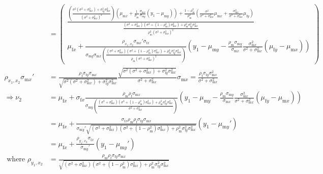\documentclass{article}
\newcommand{\x}[1]{\text{#1}}
\begin{document}
\begin{landscape}
\begin{align*}
\\&=\left(\begin{array}{cc}\frac{\left(\frac{\sigma^2(\sigma^2+\sigma_{\x{m}x}^2)+\sigma_{\x{f}y}^2\sigma_{\x{m}x}^2}{(\sigma^2+\sigma_{\x{m}x}^2)^2}\right)\left(\mu_{\x{m}x}+\frac{1}{\rho_\x{m}}\frac{\sigma_{\x{m}x}}{\sigma_{\x{m}y}}(y_1-\mu_{\x{m}y})\right)+\frac{1-\rho_\x{m}^2}{\rho_\x{m}^2}\left(\frac{\sigma^2}{\sigma^2+\sigma_{\x{m}x}^2}\mu_{\x{m}x}+\frac{\sigma_{\x{m}x}^2}{\sigma^2+\sigma_{\x{m}x}^2}\mu_{\x{f}y}\right)}{\frac{(\sigma^2+\sigma_{\x{m}x}^2)(\sigma^2+(1-\rho_\x{m}^2)\sigma_{\x{m}x}^2)+\rho_\x{m}^2\sigma_{\x{f}y}^2\sigma_{\x{m}x}^2}{\rho_\x{m}^2(\sigma^2+\sigma_{\x{m}x}^2)^2}} \\ \mu_{\x{f}x}+\frac{\rho_{x_1,x_2}\sigma_{\x{m}x}'\sigma_{\x{f}x}}{\sigma_{\x{m}y}\sigma_{\x{m}x}\left(\frac{(\sigma^2+\sigma_{\x{m}x}^2)(\sigma^2+(1-\rho_\x{m}^2)\sigma_{\x{m}x}^2)+\rho_\x{m}^2\sigma_{\x{f}y}^2\sigma_{\x{m}x}^2}{\rho_\x{m}(\sigma^2+\sigma_{\x{m}x}^2)^2}\right)}\left(y_1-\mu_{\x{m}y}-\frac{\rho_\x{m}\sigma_{\x{m}y}}{\sigma_{\x{m}x}}\frac{\sigma_{\x{m}x}^2}{\sigma^2+\sigma_{\x{m}x}^2}\left(\mu_{\x{f}y}-\mu_{\x{m}x}\right)\right) \end{array}\right)
\\ \rho_{x_1,x_2}\sigma_{\x{m}x}'&=\frac{\rho_\x{f}\sigma_{\x{f}y}\sigma_{\x{m}x}}{\sqrt{\sigma^2(\sigma^2+\sigma_{\x{m}x}^2)+\sigma_{\x{f}y}^2\sigma_{\x{m}x}^2}}\frac{\sqrt{\sigma^2(\sigma^2+\sigma_{\x{m}x}^2)+\sigma_{\x{f}y}^2\sigma_{\x{m}x}^2}}{\sigma^2+\sigma_{\x{m}x}^2}\sigma_{\x{m}x}=\frac{\rho_\x{f}\sigma_{\x{f}y}\sigma_{\x{m}x}^2}{\sigma^2+\sigma_{\x{m}x}^2}
\\ \Rightarrow \nu_2&= \mu_{\x{f}x}+\sigma_{\x{f}x}\frac{\rho_\x{m}\rho_\x{f}\sigma_{\x{m}x}}{\sigma_{\x{m}y}\left(\frac{(\sigma^2+\sigma_{\x{m}x}^2)(\sigma^2+(1-\rho_\x{m}^2)\sigma_{\x{m}x}^2)+\rho_\x{m}^2\sigma_{\x{f}y}^2\sigma_{\x{m}x}^2}{\sigma^2+\sigma_{\x{m}x}^2}\right)}\left(y_1-\mu_{\x{m}y}-\frac{\rho_\x{m}\sigma_{\x{m}y}}{\sigma_{\x{m}x}}\frac{\sigma_{\x{m}x}^2}{\sigma^2+\sigma_{\x{m}x}^2}\left(\mu_{\x{f}y}-\mu_{\x{m}x}\right)\right)
\\&= \mu_{\x{f}x}+\frac{\sigma_{\x{f}x}\rho_\x{m}\rho_\x{f}\sigma_{\x{f}y}\sigma_{\x{m}x}}{\sigma_{\x{m}y}'\sqrt{(\sigma^2+\sigma_{\x{m}x}^2)(\sigma^2+(1-\rho_\x{m}^2)\sigma_{\x{m}x}^2)+\rho_\x{m}^2\sigma_{\x{f}y}^2\sigma_{\x{m}x}^2}}\left(y_1-\mu_{\x{m}y}'\right)
\\&=\mu_{\x{f}x}+\frac{\rho_{y_1,x_2}\sigma_{\x{f}x}}{\sigma_{\x{m}y}'}(y_1-\mu_{\x{m}y}')
\\ \text{ where } \rho_{y_1,x_2}&=\frac{\rho_\x{m}\rho_\x{f}\sigma_{\x{f}y}\sigma_{\x{m}x}}{\sqrt{(\sigma^2+\sigma_{\x{m}x}^2)(\sigma^2+(1-\rho_\x{m}^2)\sigma_{\x{m}x}^2)+\rho_\x{m}^2\sigma_{\x{f}y}^2\sigma_{\x{m}x}^2}}

\end{align*}
\end{landscape}
\end{document}
